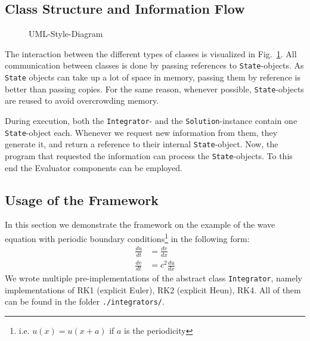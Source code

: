 \subsection{Class Structure and Information Flow}
\begin{figure}[!h]
    \caption{UML-Style-Diagram}
    \label{UML_diagram}
\end{figure}
The interaction between the different types of classes is visualized in Fig.~\ref{UML_diagram}.
All communication between classes is done by passing references to \texttt{State}-objects.
As \texttt{State} objects can take up a lot of space in memory, passing them by reference is better than passing copies.
For the same reason, whenever possible, \texttt{State}-objects are reused to avoid overcrowding memory.

During execution, both the \texttt{Integrator}- and the \texttt{Solution}-instance contain one \texttt{State}-object each.
Whenever we request new information from them, they generate it, and return a reference to their internal \texttt{State}-object.
Now, the program that requested the information can process the \texttt{State}-objects.
To this end the Evaluator components can be employed.

\subsection{Usage of the Framework}
In this section we demonstrate the framework on the example of the wave equation with periodic boundary conditions\footnote{i.e. $u(x)=u(x+a)$ if $a$ is the periodicity} in the following form:
\begin{align*}
\frac{du}{dt} &= \frac{dv}{dx}\\
\frac{dv}{dt} &= c^2\frac{du}{dx}
\end{align*}
We wrote multiple pre-implementations of the abstract class \texttt{Integrator}, namely implementations of RK1 (explicit Euler), RK2 (explicit Heun), RK4.
All of them can be found in the folder \texttt{./integrators/}.

